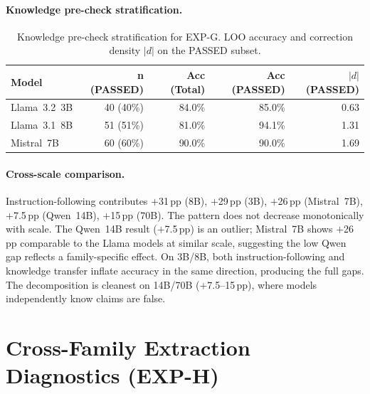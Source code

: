 \paragraph{Knowledge pre-check stratification.}

\begin{table}[h]
\centering
\caption{Knowledge pre-check stratification for EXP-G. LOO accuracy and correction density $|d|$ on the PASSED subset.}
\label{tab:knowledge_precheck_stratified}
\begin{tabular}{lrrrr}
\toprule
\textbf{Model} & \textbf{n (PASSED)} & \textbf{Acc (Total)} & \textbf{Acc (PASSED)} & \textbf{$|d|$ (PASSED)} \\
\midrule
Llama~3.2~3B  & 40 (40\%)  & 84.0\% & 85.0\% & 0.63 \\
Llama~3.1~8B  & 51 (51\%)  & 81.0\% & 94.1\% & 1.31 \\
Mistral~7B    & 60 (60\%)  & 90.0\% & 90.0\% & 1.69 \\
\bottomrule
\end{tabular}
\end{table}

\paragraph{Cross-scale comparison.} Instruction-following contributes $+$31\,pp (8B), $+$29\,pp (3B), $+$26\,pp (Mistral~7B), $+$7.5\,pp (Qwen~14B), $+$15\,pp (70B). The pattern does not decrease monotonically with scale. The Qwen~14B result ($+$7.5\,pp) is an outlier; Mistral~7B shows $+$26\,pp comparable to the Llama models at similar scale, suggesting the low Qwen gap reflects a family-specific effect. On 3B/8B, both instruction-following and knowledge transfer inflate accuracy in the same direction, producing the full gaps. The decomposition is cleanest on 14B/70B ($+$7.5--15\,pp), where models independently know claims are false.

\section{Cross-Family Extraction Diagnostics (EXP-H)}
\label{app:cross_family_details}

